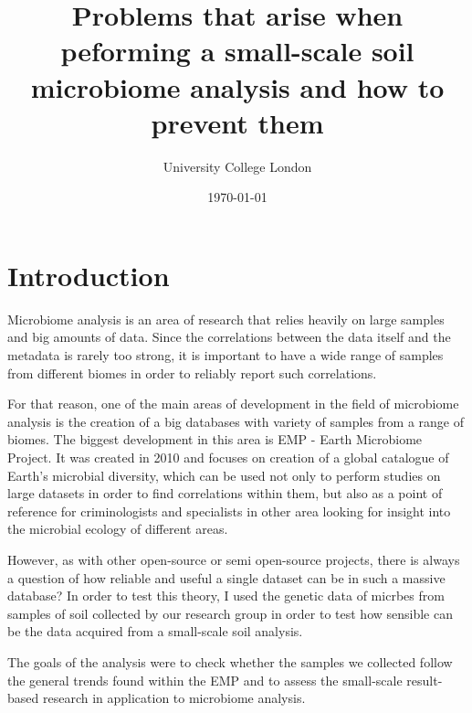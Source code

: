 \documentclass[12pt,twocolumn]{article}
\title{Problems that arise when peforming a small-scale soil microbiome analysis and how to prevent them}
\author{\normalsize University College London \\}
\date{\today}
\begin{document}
	
\maketitle

\section{Introduction}
Microbiome analysis is an area of research that relies heavily on large samples and big amounts of data. Since the correlations between the data itself and the metadata is rarely too strong, it is important to have a wide range of samples from different biomes in order to reliably report such correlations.
\par
For that reason, one of the main areas of development in the field of microbiome analysis is the creation of a big databases with variety of samples from a range of biomes. The biggest development in this area is  EMP - Earth Microbiome Project\cite{Gilbert2014}. It was created in 2010 and focuses on creation of a global catalogue of Earth's microbial diversity, which can be used not only to perform studies on large datasets in order to find correlations within them, but also as a point of reference for criminologists and specialists in other area looking for insight into the microbial ecology of different areas.
\par
However, as with other open-source or semi open-source projects, there is always a question of how reliable and useful a single dataset can be in such a massive database? In order to test this theory, I used the genetic data of micrbes from samples of soil collected by our research group in order to test how sensible can be the data acquired from a small-scale soil analysis.
\par
The goals of the analysis were to check whether the samples we collected follow the general trends found within the EMP and to assess the small-scale result-based research in application to microbiome analysis.
%
%
\end{document}
